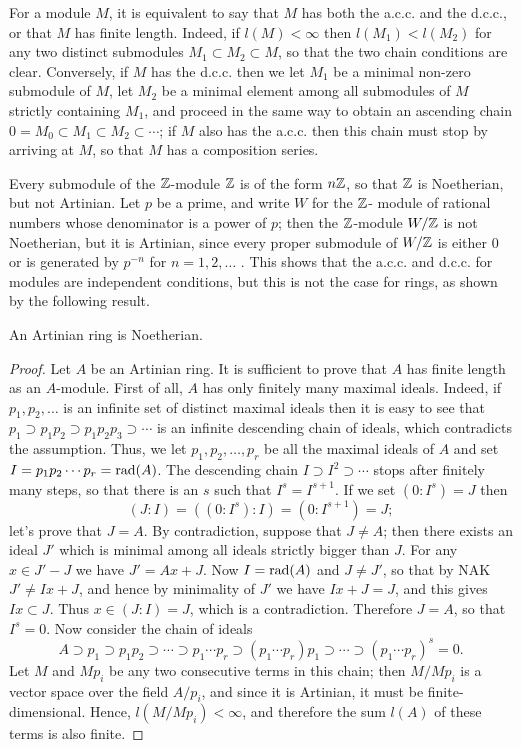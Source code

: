 For a module $M$, it is equivalent to say that $M$ has both the a.c.c. and
the d.c.c., or that $M$ has finite length. Indeed, if $l(M) < \infty$ then $l(M_1) < l(M_2)$
for any two distinct submodules $M_1 \subset M_2 \subset M$, so that the two chain
conditions are clear. Conversely, if $M$ has the d.c.c. then we let $M_1$ be a
minimal non-zero submodule of $M$, let $M_2$ be a minimal element among all
submodules of $M$ strictly containing $M_1$, and proceed in the same way to
obtain an ascending chain $0 = M_0 \subset M_1 \subset M_2 \subset \cdots$; if $M$ also has the a.c.c.
then this chain must stop by arriving at $M$, so that $M$ has a composition
series.

Every submodule of the $\mathbb{Z}$-module $\mathbb{Z}$ is of the form $n\mathbb{Z}$, so that $\mathbb{Z}$ is
Noetherian, but not Artinian. Let $p$ be a prime, and write $W$ for the $\mathbb{Z}$-
module of rational numbers whose denominator is a power of $p$; then
the $\mathbb{Z}$-module $W/\mathbb{Z}$ is not Noetherian, but it is Artinian, since every proper
submodule of $W/\mathbb{Z}$ is either $0$ or is generated by $p^{-n}$ for $n = 1, 2, \ldots$ . This
shows that the a.c.c. and d.c.c. for modules are independent conditions,
but this is not the case for rings, as shown by the following result.

\begin{theorem}[Y.\ Akizuki]\label{thm:3.2}
An Artinian ring is Noetherian.
\end{theorem}

\begin{proof}
Let $A$ be an Artinian ring. It is sufficient to prove that $A$ has finite
length as an $A$-module. First of all, $A$ has only finitely many maximal ideals.
Indeed, if $p_1, p_2, \ldots$ is an infinite set of distinct maximal ideals then it is easy
to see that $p_1 \supset p_1p_2 \supset p_1p_2p_3 \supset \cdots$ is an infinite descending chain of ideals,
which contradicts the assumption. Thus, we let $p_1, p_2, \ldots, p_r$ be all the
maximal ideals of $A$ and set $I = p_1p_2 \cdots p_r = \operatorname{rad}(A)$. The descending chain
$I \supset I^2 \supset \cdots$ stops after finitely many steps, so that there is an $s$ such that
$I^s = I^{s+1}$. If we set $(0:I^s) = J$ then
\[
  (J:I) = ((0:I^s):I) = (0:I^{s+1}) = J;
\]
let's prove that $J = A$. By contradiction, suppose that $J \neq A$; then there exists
an ideal $J'$ which is minimal among all ideals strictly bigger than $J$. For any
$x \in J' - J$ we have $J' = Ax + J$. Now $I = \operatorname{rad}(A)$ and $J \neq J'$, so that by NAK
$J' \neq Ix + J$, and hence by minimality of $J'$ we have $Ix + J = J$, and this gives
$Ix \subset J$. Thus $x \in (J:I) = J$, which is a contradiction. Therefore $J = A$, so that
$I^s = 0$. Now consider the chain of ideals
\[
  A \supset p_1 \supset p_1p_2 \supset \cdots \supset p_1 \cdots p_r \supset (p_1 \cdots p_r)p_1 \supset \cdots \supset (p_1 \cdots p_r)^s = 0.
\]
Let $M$ and $Mp_i$ be any two consecutive terms in this chain; then $M/Mp_i$ is a
vector space over the field $A/p_i$, and since it is Artinian, it must be finite-
dimensional. Hence, $l(M/Mp_i) < \infty$, and therefore the sum $l(A)$ of these
terms is also finite.
\end{proof}

